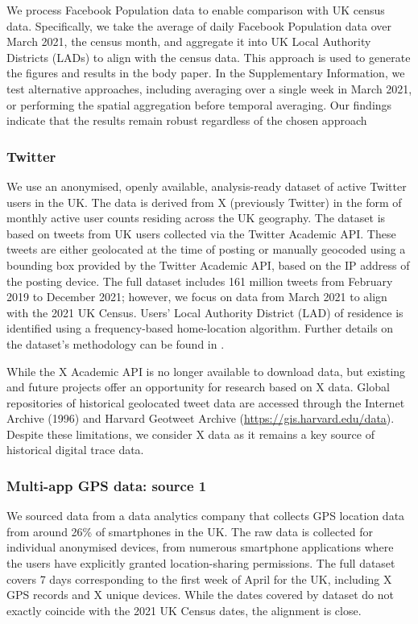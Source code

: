 \documentclass[]{rsos}%
\begin{document}
We process Facebook Population data to enable comparison with UK census
data. Specifically, we take the average of daily Facebook Population
data over March 2021, the census month, and aggregate it into UK Local
Authority Districts (LADs) to align with the census data. This approach
is used to generate the figures and results in the body paper. In the
Supplementary Information, we test alternative approaches, including
averaging over a single week in March 2021, or performing the spatial
aggregation before temporal averaging. Our findings indicate that the
results remain robust regardless of the chosen approach

\subsubsection{Twitter}\label{twitter}

We use an anonymised, openly available, analysis-ready dataset of active
Twitter users in the UK. The data is derived from X (previously Twitter)
in the form of monthly active user counts residing across the UK
geography. The dataset is based on tweets from UK users \citep{wang2022}
collected via the Twitter Academic API. These tweets are either
geolocated at the time of posting or manually geocoded using a bounding
box provided by the Twitter Academic API, based on the IP address of the
posting device. The full dataset includes 161 million tweets from
February 2019 to December 2021; however, we focus on data from March
2021 to align with the 2021 UK Census. Users' Local Authority District
(LAD) of residence is identified using a frequency-based home-location
algorithm. Further details on the dataset's methodology can be found in
\citep{wang2022} .

While the X Academic API is no longer available to download data, but
existing and future projects offer an opportunity for research based on
X data. Global repositories of historical geolocated tweet data are
accessed through the Internet Archive (1996) and Harvard Geotweet
Archive (\url{https://gis.harvard.edu/data}). Despite these limitations, we
consider X data as it remains a key source of historical digital trace
data.

\subsubsection{Multi-app GPS data: source 1}\label{multi-app-gps-data-source-1}

We sourced data from a data analytics company that collects GPS location
data from around 26\% of smartphones in the UK. The raw data is collected
for individual anonymised devices, from numerous smartphone applications
where the users have explicitly granted location-sharing permissions.
The full dataset covers 7 days corresponding to the first week of April
for the UK, including X GPS records and X unique devices. While the
dates covered by dataset do not exactly coincide with the 2021 UK Census
dates, the alignment is close.
\end{document}
